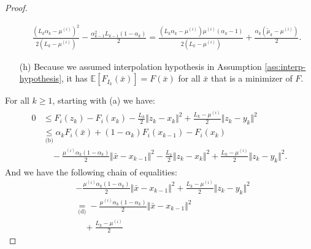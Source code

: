 \documentclass[12pt]{article}
\begin{document}
\begin{proof}
\begin{itemize}
                \begin{align*}
                    \frac{\left(
                        L_k\alpha_k - \mu^{(i)}
                    \right)^2}{2(L_k - \mu^{(i)})} 
                    -
                    \frac{\alpha_{k - 1}^2L_{k - 1}(1 - \alpha_k)}{2} 
                    = 
                    \frac{
                    \left(L_k \alpha_k - \mu^{(i)}\right)\mu^{(i)}
                    \left(\alpha_k - 1\right)
                    }
                    {2(L_k - \mu^{(i)})}
                    + \frac{\alpha_k(\tilde \mu_k - \mu^{(i)})}{2}. 
                \end{align*}
                \item[(h)] Because we assumed interpolation hypothesis in Assumption \ref{ass:interp-hypothesis}, it has $\mathbb E[F_{I_k}(\bar x)] = F(\bar x)$ for all $\bar x$ that is a minimizer of $F$. 
            \end{itemize}
            For all $k \ge 1$, starting with (a) we have: 
            \begin{align}\label{ineq:snapg2-one-step-chain1}
                \begin{split}
                    0 &\le F_i(z_k) - F_i(x_k) - \frac{L_k}{2}\Vert z_k - x_k\Vert^2 + \frac{L_k - \mu^{(i)}}{2}\Vert z_k - y_k\Vert^2
                    \\
                    &\underset{\text{(b)}}{\le}
                    \alpha_k F_i(\bar x) + (1 - \alpha_k)F_i(x_{k - 1}) - F_i(x_k) \\
                        &\quad 
                        - \frac{\mu^{(i)}\alpha_k(1 - \alpha_k)}{2}\Vert \bar x - x_{k - 1}\Vert^2
                        - \frac{L_k}{2}\Vert z_k - x_k\Vert^2 
                        + \frac{L_k - \mu^{(i)}}{2}\Vert z_k - y_k\Vert^2. 
                \end{split}
            \end{align}
            And we have the following chain of equalities:
            {\allowdisplaybreaks
            \begin{align*}
                & - \frac{\mu^{(i)}\alpha_k(1 - \alpha_k)}{2}\Vert \bar x - x_{k - 1}\Vert^2
                + \frac{L_k - \mu^{(i)}}{2}\Vert z_k - y_k\Vert^2
                \\
                &\underset{\text{(d)}}{=}
                - \frac{\mu^{(i)}\alpha_k(1 - \alpha_k)}{2}\Vert \bar x - x_{k - 1}\Vert^2 
                    \\&\quad
                    + \frac{L_k - \mu^{(i)}}{2}

\end{align*}}
\end{proof}
\end{document}
